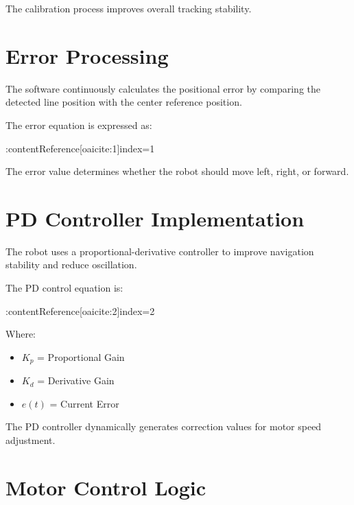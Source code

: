 \documentclass[12pt,a4paper,oneside]{report}
\begin{document}
The calibration process improves overall tracking stability.


\section{Error Processing}

The software continuously calculates the positional error by comparing the detected line position with the center reference position.

The error equation is expressed as:

:contentReference[oaicite:1]{index=1}

The error value determines whether the robot should move left, right, or forward.


\section{PD Controller Implementation}

The robot uses a proportional-derivative controller to improve navigation stability and reduce oscillation.

The PD control equation is:

:contentReference[oaicite:2]{index=2}

Where:

\begin{itemize}

\item \(K_p\) = Proportional Gain

\item \(K_d\) = Derivative Gain

\item \(e(t)\) = Current Error

\end{itemize}

The PD controller dynamically generates correction values for motor speed adjustment.


\section{Motor Control Logic}
\end{document}
